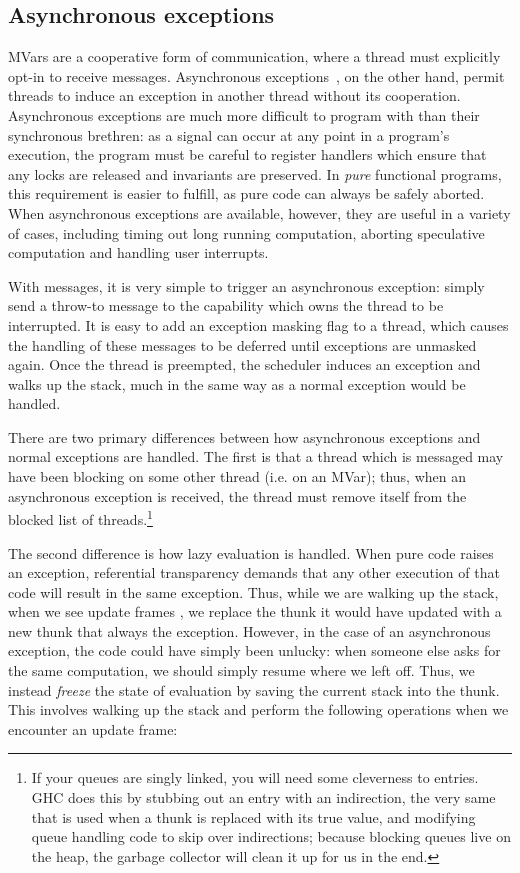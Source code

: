 \subsection{Asynchronous exceptions}

MVars are a cooperative form of communication, where a thread must
explicitly opt-in to receive messages.  Asynchronous
exceptions~\cite{Marlow:2001:AEH:378795.378858}, on the other hand,
permit threads to induce an exception in another thread
without its cooperation.  Asynchronous exceptions are much more
difficult to program with than their synchronous brethren: as a signal can
occur at any point in a program's execution, the program must be careful
to register handlers which ensure that any locks are released and
invariants are preserved.  In \emph{pure} functional programs, this requirement
is easier to fulfill, as pure code can always be safely aborted.  When
asynchronous exceptions are available, however, they are useful
in a variety of cases, including timing out long running computation,
aborting speculative computation and handling user interrupts.

With messages, it is very simple to trigger an asynchronous exception:
simply send a throw-to message to the capability which owns the thread
to be interrupted.  It is easy to add an exception masking flag to a
thread, which causes the handling of these messages to be deferred until
exceptions are unmasked again.  Once the thread is preempted, the
scheduler induces an exception and walks up the stack, much in the same
way as a normal exception would be handled.

There are two primary differences between how asynchronous exceptions
and normal exceptions are handled.  The first is that a thread which is
messaged may have been blocking on some other thread (i.e. on an MVar);
thus, when an asynchronous exception is received, the thread must remove
itself from the blocked list of threads.\footnote{If your queues are
    singly linked, you will need some cleverness to entries. GHC does
    this by stubbing out an entry with an indirection, the very same
that is used when a thunk is replaced with its true value, and modifying
queue handling code to skip over indirections; because blocking queues
live on the heap, the garbage collector will clean it up for us in the end.}

The second difference is how lazy evaluation is handled. When pure code
raises an exception, referential transparency demands that any other
execution of that code will result in the same exception.  Thus, while
we are walking up the stack, when we see update frames ,
we replace the thunk it would have updated with a new thunk that always
the exception.  However, in the case of an asynchronous exception, the
code could have simply been unlucky: when someone else asks for the same
computation, we should simply resume where we left off.  Thus, we
instead \emph{freeze} the state of evaluation by saving the current
stack into the thunk.~\cite{Reid1999}  This involves walking up the stack
and perform the following operations when we encounter an update frame:

